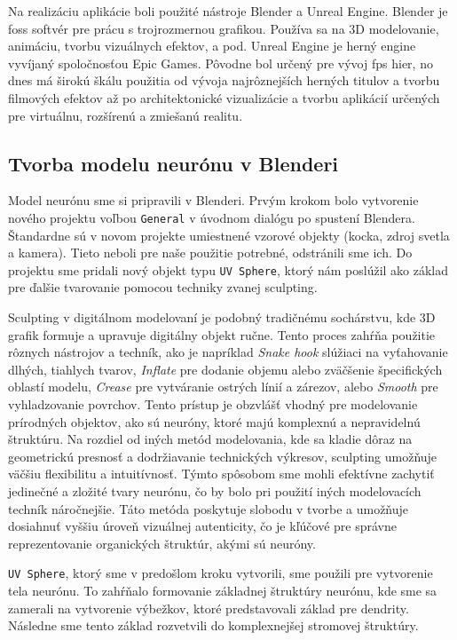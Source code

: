 Na realizáciu aplikácie boli použité nástroje Blender a Unreal Engine. Blender je \acrshort{foss} softvér pre prácu s trojrozmernou grafikou. Používa sa na 3D modelovanie,
animáciu, tvorbu vizuálnych efektov, a pod. Unreal Engine je herný engine vyvíjaný spoločnosťou Epic Games. Pôvodne bol určený pre vývoj \acrshort{fps} hier, no dnes má širokú škálu použitia
od vývoja najrôznejších herných titulov a tvorbu filmových efektov až po architektonické vizualizácie a tvorbu aplikácií určených pre virtuálnu, rozšírenú a zmiešanú realitu.

\subsection{Tvorba modelu neurónu v Blenderi}
Model neurónu sme si pripravili v Blenderi. Prvým krokom bolo vytvorenie nového projektu voľbou \texttt{General} v úvodnom dialógu po spustení Blendera. Štandardne sú v novom projekte 
umiestnené vzorové objekty (kocka, zdroj svetla a kamera). Tieto neboli pre naše použitie potrebné, odstránili sme ich. Do projektu sme pridali nový objekt typu \texttt{UV Sphere}, 
ktorý nám poslúžil ako základ pre ďalšie tvarovanie pomocou techniky zvanej sculpting. 

Sculpting v digitálnom modelovaní je podobný tradičnému sochárstvu, kde 3D grafik formuje a upravuje digitálny objekt ručne. Tento proces zahŕňa použitie
rôznych nástrojov a techník, ako je napríklad \emph{Snake hook} slúžiaci na vyťahovanie dlhých, tiahlych tvarov, \emph{Inflate} pre dodanie objemu alebo zväčšenie špecifických oblastí modelu,
\emph{Crease} pre vytváranie ostrých línií a zárezov, alebo \emph{Smooth} pre vyhladzovanie povrchov. Tento prístup je obzvlášť vhodný pre modelovanie prírodných objektov, ako sú neuróny, 
ktoré majú komplexnú a nepravidelnú štruktúru. Na rozdiel od iných metód modelovania, kde sa kladie dôraz na geometrickú presnosť a dodržiavanie technických výkresov, sculpting umožňuje 
väčšiu flexibilitu a intuitívnosť. Týmto spôsobom sme mohli efektívne zachytiť jedinečné a zložité tvary neurónu, čo by bolo pri použití iných modelovacích techník náročnejšie. 
Táto metóda poskytuje slobodu v tvorbe a umožňuje dosiahnuť vyššiu úroveň vizuálnej autenticity, čo je kľúčové pre správne reprezentovanie organických štruktúr, akými sú neuróny.

\texttt{UV Sphere}, ktorý sme v predošlom kroku vytvorili, sme použili pre vytvorenie tela neurónu. To zahŕňalo formovanie základnej štruktúry neurónu, kde sme sa zamerali na vytvorenie
výbežkov, ktoré predstavovali základ pre dendrity. Následne sme tento základ rozvetvili do komplexnejšej stromovej štruktúry.

